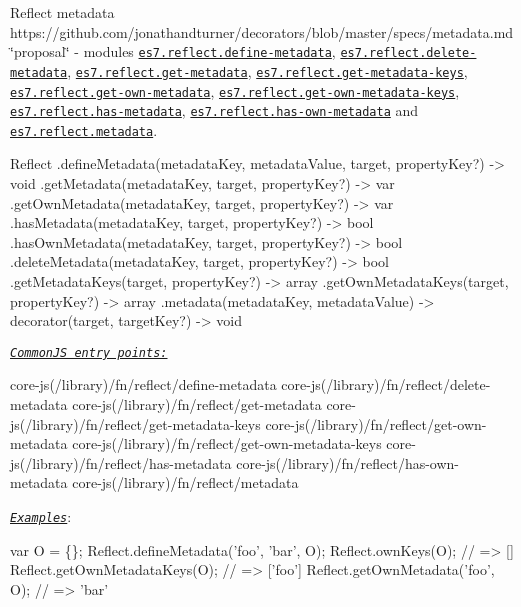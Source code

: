 \begin{DoxyItemize}
\item {\ttfamily Reflect} metadata https\+://github.com/jonathandturner/decorators/blob/master/specs/metadata.\+md \char`\"{}proposal\char`\"{} -\/ modules \href{https://github.com/zloirock/core-js/blob/v2.6.0/modules/es7.reflect.define-metadata.js}{\tt {\ttfamily es7.\+reflect.\+define-\/metadata}}, \href{https://github.com/zloirock/core-js/blob/v2.6.0/modules/es7.reflect.delete-metadata.js}{\tt {\ttfamily es7.\+reflect.\+delete-\/metadata}}, \href{https://github.com/zloirock/core-js/blob/v2.6.0/modules/es7.reflect.get-metadata.js}{\tt {\ttfamily es7.\+reflect.\+get-\/metadata}}, \href{https://github.com/zloirock/core-js/blob/v2.6.0/modules/es7.reflect.get-metadata-keys.js}{\tt {\ttfamily es7.\+reflect.\+get-\/metadata-\/keys}}, \href{https://github.com/zloirock/core-js/blob/v2.6.0/modules/es7.reflect.get-own-metadata.js}{\tt {\ttfamily es7.\+reflect.\+get-\/own-\/metadata}}, \href{https://github.com/zloirock/core-js/blob/v2.6.0/modules/es7.reflect.get-own-metadata-keys.js}{\tt {\ttfamily es7.\+reflect.\+get-\/own-\/metadata-\/keys}}, \href{https://github.com/zloirock/core-js/blob/v2.6.0/modules/es7.reflect.has-metadata.js}{\tt {\ttfamily es7.\+reflect.\+has-\/metadata}}, \href{https://github.com/zloirock/core-js/blob/v2.6.0/modules/es7.reflect.has-own-metadata.js}{\tt {\ttfamily es7.\+reflect.\+has-\/own-\/metadata}} and \href{https://github.com/zloirock/core-js/blob/v2.6.0/modules/es7.reflect.metadata.js}{\tt {\ttfamily es7.\+reflect.\+metadata}}. 
\begin{DoxyCode}
Reflect
  .defineMetadata(metadataKey, metadataValue, target, propertyKey?) -> void
  .getMetadata(metadataKey, target, propertyKey?) -> var
  .getOwnMetadata(metadataKey, target, propertyKey?) -> var
  .hasMetadata(metadataKey, target, propertyKey?) -> bool
  .hasOwnMetadata(metadataKey, target, propertyKey?) -> bool
  .deleteMetadata(metadataKey, target, propertyKey?) -> bool
  .getMetadataKeys(target, propertyKey?) -> array
  .getOwnMetadataKeys(target, propertyKey?) -> array
  .metadata(metadataKey, metadataValue) -> decorator(target, targetKey?) -> void
\end{DoxyCode}
 \href{#commonjs}{\tt {\itshape Common\+JS entry points\+:}} 
\begin{DoxyCode}
core-js(/library)/fn/reflect/define-metadata
core-js(/library)/fn/reflect/delete-metadata
core-js(/library)/fn/reflect/get-metadata
core-js(/library)/fn/reflect/get-metadata-keys
core-js(/library)/fn/reflect/get-own-metadata
core-js(/library)/fn/reflect/get-own-metadata-keys
core-js(/library)/fn/reflect/has-metadata
core-js(/library)/fn/reflect/has-own-metadata
core-js(/library)/fn/reflect/metadata
\end{DoxyCode}
 \href{http://goo.gl/KCo3PS}{\tt {\itshape Examples}}\+: 
\begin{DoxyCode}
var O = \{\};
Reflect.defineMetadata('foo', 'bar', O);
Reflect.ownKeys(O);               // => []
Reflect.getOwnMetadataKeys(O);    // => ['foo']
Reflect.getOwnMetadata('foo', O); // => 'bar'
\end{DoxyCode}

\end{DoxyItemize}

